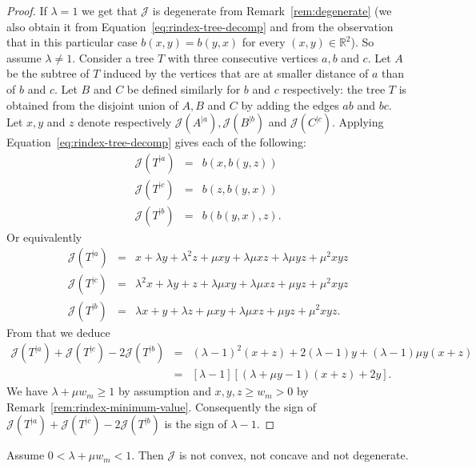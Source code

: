 \documentclass[11 pt]{modarticle}
\newcommand{\cR}{\mathbb{R}}
\newcommand{\wmin}{w_m}
\newcommand{\rtree}[2]{{#1}^{\lvert #2}}
\newcommand{\bilinear}{b}
\newcommand{\rindexsymbol}{\mathcal{J}}
\newcommand{\rindex}[2]{\rindexsymbol(\rtree{#2}{#1})}
\begin{document}
\begin{proof}
If $\lambda = 1$ we get that $\rindexsymbol$ is degenerate from Remark~\ref{rem:degenerate} (we also obtain it from Equation~\eqref{eq:rindex-tree-decomp} and from the observation that in this particular case $\bilinear(x,y) = \bilinear(y,x)$ for every $(x,y) \in \cR^2$). So assume $\lambda \neq 1$. Consider a tree $T$ with three consecutive vertices $a,b$ and $c$. Let $A$ be the subtree of $T$ induced by the vertices that are at smaller distance of $a$ than of $b$ and $c$. Let $B$ and $C$ be defined similarly for $b$ and $c$ respectively: the tree $T$ is obtained from the disjoint union of $A,B$ and $C$ by adding the edges $ab$ and $bc$. Let $x,y$ and $z$ denote respectively $\rindex{a}{A}, \rindex{b}{B}$ and $\rindex{c}{C}$. Applying Equation~\eqref{eq:rindex-tree-decomp} gives each of the following:
\begin{eqnarray*}
	\rindex{a}{T} & = & \bilinear(x,\bilinear(y,z)) \\
	\rindex{c}{T} & = & \bilinear(z,\bilinear(y,x)) \\
	\rindex{b}{T} & = & \bilinear(\bilinear(y,x),z).
\end{eqnarray*}
Or equivalently
\begin{eqnarray*}
	\rindex{a}{T} & = & x + \lambda y + \lambda^2 z + \mu xy + \lambda \mu xz + \lambda \mu yz + \mu^2 xyz \\
	\rindex{c}{T} & = & \lambda^2 x + \lambda y + z + \lambda \mu xy + \lambda \mu xz + \mu yz + \mu^2 xyz \\
	\rindex{b}{T} & = & \lambda x + y + \lambda z + \mu xy + \lambda \mu xz + \mu yz + \mu^2 xyz.
\end{eqnarray*}
From that we deduce
\begin{eqnarray}
	\rindex{a}{T} + \rindex{c}{T} - 2 \rindex{b}{T} & = & (\lambda-1)^2 (x + z) + 2 (\lambda - 1) y + (\lambda-1) \mu y (x+z) \nonumber \\
	& = & [\lambda - 1][(\lambda + \mu y - 1)(x+z) + 2y]. \label{eq:convexity}
\end{eqnarray}
We have $\lambda + \mu \wmin \geq 1$ by assumption and $x,y,z \geq \wmin > 0$ by Remark~\ref{rem:rindex-minimum-value}. Consequently the sign of $\rindex{a}{T} + \rindex{c}{T} - 2 \rindex{b}{T}$ is the sign of $\lambda - 1$.
\end{proof}

\begin{prop}
Assume $0 < \lambda + \mu \wmin < 1$. Then $\rindexsymbol$ is not convex, not concave and not degenerate.
\end{prop}
\end{document}
